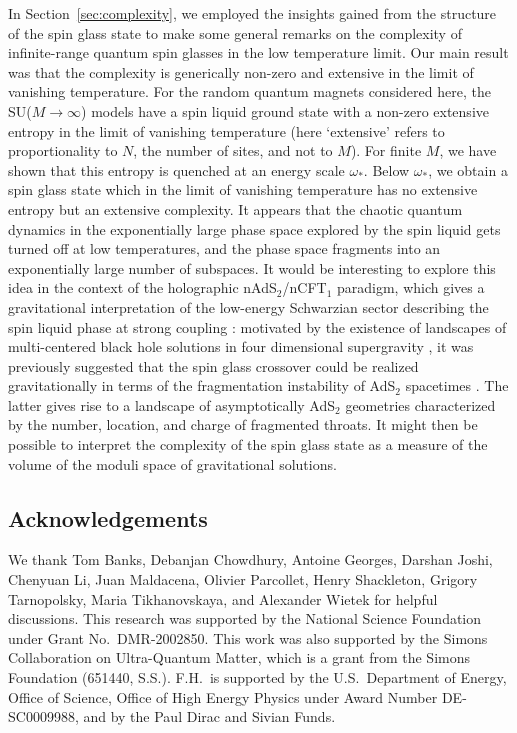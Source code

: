 \documentclass[aps,prx,preprint,onecolumn,citeautoscript,superscriptaddress,nofootinbib,
eqsecnum]{revtex4}
\begin{document}
{In Section~\ref{sec:complexity}, we employed the insights gained from the structure of the 
spin glass state to make some general remarks on the complexity of infinite-range quantum spin glasses in the low temperature limit. Our main result was that the complexity is generically non-zero and extensive in the limit of vanishing temperature. For the random quantum magnets considered here, the SU($M \rightarrow \infty$) models have a spin liquid ground state with a non-zero extensive entropy in the limit of vanishing temperature \cite{GPS01} (here `extensive' refers to proportionality to $N$, the number of sites, and not to $M$). For finite $M$, we have shown that this entropy is quenched at an energy scale $\omega_\ast$. Below $\omega_\ast$, 
we obtain a spin glass state which in the limit of vanishing temperature has no extensive entropy but an extensive complexity. It appears that the chaotic quantum dynamics in the exponentially large phase space explored by the spin liquid gets turned off at low temperatures, and the phase space fragments into an exponentially large number of subspaces.
It would be interesting to explore this idea in the context of the holographic nAdS$_2$/nCFT$_1$ paradigm, which gives a gravitational interpretation of the low-energy Schwarzian sector describing the spin liquid phase at strong coupling \cite{kitaev2015talk,Maldacena:2016upp}: motivated by the existence of landscapes of multi-centered black hole solutions in four dimensional supergravity \cite{Denef:2000nb,Bates:2003vx}, it was previously suggested \cite{Anninos:2011vn,Anninos:2013mfa,Anninos:2016szt,Anous:2021eqj} that the spin glass crossover could be realized gravitationally in terms of the fragmentation instability of AdS${}_2$ spacetimes \cite{Maldacena:1998uz}. The latter gives rise to a landscape of asymptotically AdS${}_2$ geometries characterized by the number, location, and charge of fragmented throats. It might then be possible to interpret the complexity of the spin glass state as a measure of the volume of the moduli space of gravitational solutions.



\subsection*{Acknowledgements}

We thank Tom Banks, Debanjan Chowdhury, Antoine Georges, Darshan Joshi, Chenyuan Li, Juan Maldacena, Olivier Parcollet, Henry Shackleton, Grigory Tarnopolsky, Maria Tikhanovskaya, and Alexander Wietek for helpful discussions.
This research was supported by the National Science Foundation under Grant No.~DMR-2002850. This work was also supported by the Simons Collaboration on Ultra-Quantum Matter, which is a grant from the Simons Foundation (651440, S.S.). F.H.\ is supported by the U.S.\ Department of Energy, Office of Science, Office of High Energy Physics under Award Number DE-SC0009988, and by the Paul Dirac and Sivian Funds.

}
\end{document}
